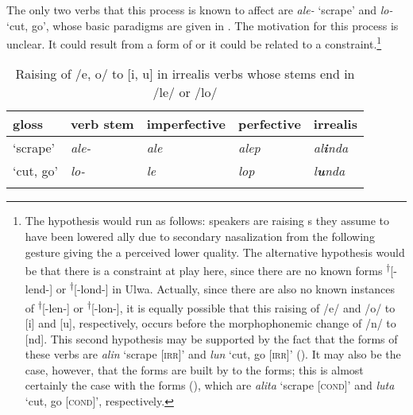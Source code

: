 The only two verbs that this process is known to affect are \textit{ale-} ‘scrape’ and \textit{lo-} ‘cut, go’, whose basic paradigms are given in . The  motivation for this process is unclear. It could result from a form of  or it could be related to a  constraint.\footnote{The  hypothesis would run as follows: speakers are raising s they assume to have been lowered ally due to secondary nasalization from the following  gesture giving the  a perceived lower quality. The alternative hypothesis would be that there is a  constraint at play here, since there are no known forms \textsuperscript{†}[-lend-] or \textsuperscript{†}[-lond-] in Ulwa. Actually, since there are also no known instances of \textsuperscript{†}[-len-] or \textsuperscript{†}[-lon-], it is equally possible that this raising of /e/ and /o/ to [i] and [u], respectively, occurs before the  morphophonemic change of /n/ to [nd]. This second hypothesis may be supported by the fact that the  forms of these verbs are \textit{alin} ‘scrape [\textsc{irr]}’ and \textit{lun} ‘cut, go [\textsc{irr]}’ (). It may also be the case, however, that the  forms are built by  to the  forms; this is almost certainly the case with the  forms (), which are \textit{alita} ‘scrape [\textsc{cond]}’ and \textit{luta} ‘cut, go [\textsc{cond]}’, respectively.}

\begin{table}
\caption{Raising of /e, o/ to [i, u] in irrealis verbs whose stems end in /le/ or /lo/}
\label{tab:4.2}
\begin{tabularx}{\textwidth}{QQQQQ}
\lsptoprule
gloss & verb stem & imperfective & perfective & irrealis\\
\midrule
‘scrape’ & {\itshape ale-}  & {\itshape ale} & {\itshape alep} & {\itshape al\textbf{i}nda}\\
‘cut, go’ & {\itshape lo-} & {\itshape le} & {\itshape lop} & {\itshape l\textbf{u}nda}\\
\lspbottomrule
\end{tabularx}
\end{table}


